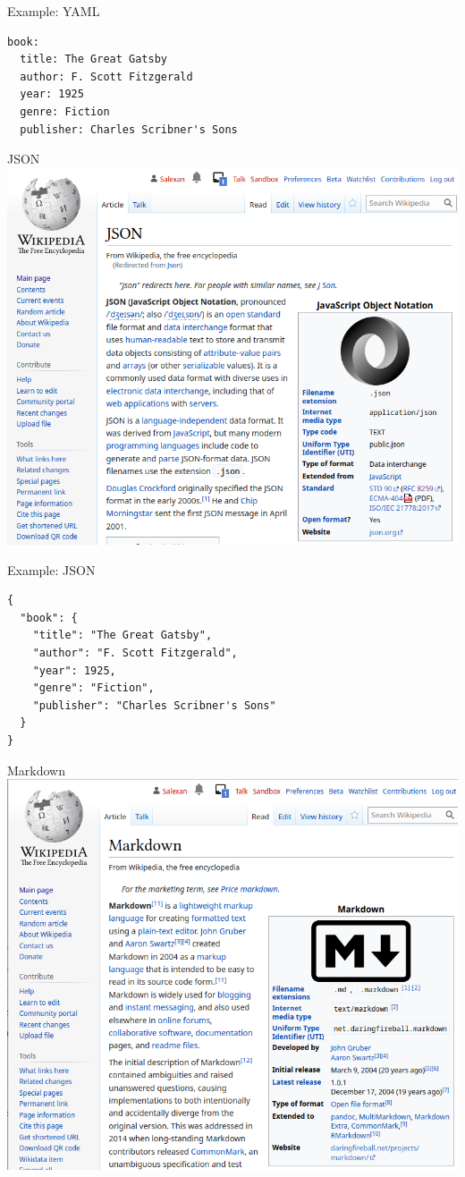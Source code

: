 \documentclass[aspectratio=169,graphics,handout]{beamer}
\begin{document}
\begin{frame}[fragile]{Example: YAML}
\begin{verbatim}
book:
  title: The Great Gatsby
  author: F. Scott Fitzgerald
  year: 1925
  genre: Fiction
  publisher: Charles Scribner's Sons
\end{verbatim}
\end{frame}

\begin{frame}{JSON}
    \includegraphics[width=\textwidth]{json.png}
\end{frame}

\begin{frame}[fragile]{Example: JSON}
    \begin{verbatim}
{
  "book": {
    "title": "The Great Gatsby",
    "author": "F. Scott Fitzgerald",
    "year": 1925,
    "genre": "Fiction",
    "publisher": "Charles Scribner's Sons"
  }
}
    \end{verbatim}
\end{frame}

\begin{frame}{Markdown}
    \includegraphics[width=\textwidth]{markdown.png}
\end{frame}
\end{document}
